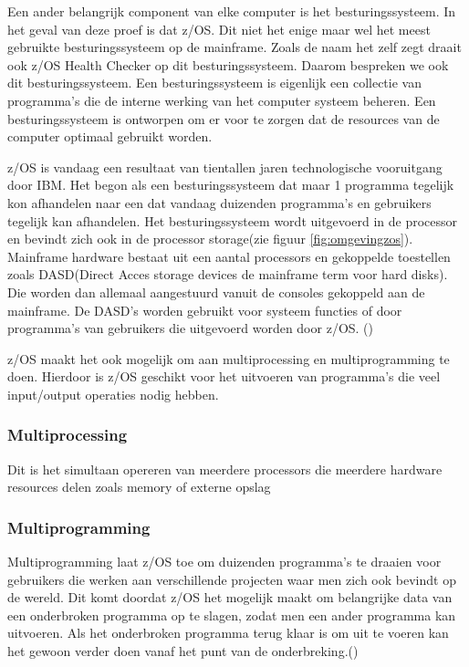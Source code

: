 Een ander belangrijk component van elke computer is het besturingssysteem. In het geval van deze proef is dat z/OS. Dit niet het enige maar wel het meest gebruikte besturingssysteem op de mainframe. Zoals de naam het zelf zegt draait ook z/OS Health Checker op dit besturingssysteem. Daarom bespreken we ook dit besturingssysteem. Een besturingssysteem is eigenlijk een collectie van programma's die de interne werking van het computer systeem beheren. Een besturingssysteem is ontworpen om er voor te zorgen dat de resources van de computer optimaal gebruikt worden.

z/OS is vandaag een resultaat van tientallen jaren technologische vooruitgang door IBM. Het begon als een besturingssysteem dat maar 1 programma tegelijk kon afhandelen naar een dat vandaag duizenden programma's en gebruikers tegelijk kan afhandelen. Het besturingssysteem wordt uitgevoerd in de processor en bevindt zich ook in de processor storage(zie figuur \ref{fig:omgevingzos}). Mainframe hardware bestaat uit een aantal processors en gekoppelde toestellen zoals DASD(Direct Acces storage devices de mainframe term voor hard disks). Die worden dan allemaal aangestuurd vanuit de consoles gekoppeld aan de mainframe. De DASD's worden gebruikt voor systeem functies of door programma's van gebruikers die uitgevoerd worden door z/OS. (\cite{Ebbers2011})


z/OS maakt het ook mogelijk om aan multiprocessing en multiprogramming te doen. Hierdoor is z/OS geschikt voor het uitvoeren van programma's die veel input/output operaties nodig hebben. 

\subsubsection{Multiprocessing}
\label{subsubsec:Multiprocessing}
Dit is het simultaan opereren van meerdere processors die meerdere hardware resources delen zoals memory of externe opslag

\subsubsection{Multiprogramming}
\label{subsubsec:Multiprogramming}
Multiprogramming laat z/OS toe om duizenden programma's te draaien voor gebruikers die werken aan verschillende projecten waar men zich ook bevindt op de wereld. Dit komt doordat z/OS het mogelijk maakt om belangrijke data van een onderbroken programma op te slagen, zodat men een ander programma kan uitvoeren. Als het onderbroken programma terug klaar is om uit te voeren kan het gewoon verder doen vanaf het punt van de onderbreking.(\cite{Ebbers2011})


